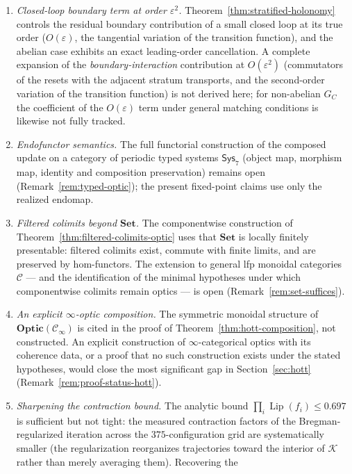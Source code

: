 \documentclass[11pt,a4paper]{article}
\theoremstyle{plain}
\theoremstyle{definition}
\theoremstyle{remark}
\newcommand{\CC}{\mathcal{C}}
\newcommand{\Optic}{\mathbf{Optic}}
\DeclareMathOperator{\Lip}{Lip}
\begin{document}
\begin{enumerate}[leftmargin=*,itemsep=3pt]
\item \emph{Closed-loop boundary term at order $\varepsilon^2$.}
Theorem~\ref{thm:stratified-holonomy} controls the residual boundary
contribution of a small closed loop at its true order
($O(\varepsilon)$, the tangential variation of the transition
function), and the abelian case exhibits an exact leading-order
cancellation. A complete expansion of the
\emph{boundary-interaction} contribution at $O(\varepsilon^2)$
(commutators of the resets with the adjacent stratum transports, and
the second-order variation of the transition function) is not
derived here; for non-abelian $G_C$ the coefficient of the
$O(\varepsilon)$ term under general matching conditions is likewise
not fully tracked.
\item \emph{Endofunctor semantics.} The full functorial construction
of the composed update on a category of periodic typed systems
$\mathsf{Sys}_7$ (object map, morphism map, identity and composition
preservation) remains open
(Remark~\ref{rem:typed-optic}); the present fixed-point claims use
only the realized endomap.
\item \emph{Filtered colimits beyond $\mathbf{Set}$.} The
componentwise construction of
Theorem~\ref{thm:filtered-colimits-optic} uses that $\mathbf{Set}$ is
locally finitely presentable: filtered colimits exist, commute with
finite limits, and are preserved by hom-functors. The extension to
general lfp monoidal categories $\CC$ --- and the identification of
the minimal hypotheses under which componentwise colimits remain
optics --- is open (Remark~\ref{rem:set-suffices}).
\item \emph{An explicit $\infty$-optic composition.} The symmetric
monoidal structure of $\Optic(\mathcal{C}_\infty)$ is cited in the
proof of Theorem~\ref{thm:hott-composition}, not constructed. An
explicit construction of $\infty$-categorical optics with its
coherence data, or a proof that no such construction exists under
the stated hypotheses, would close the most significant gap in
Section~\ref{sec:hott} (Remark~\ref{rem:proof-status-hott}).
\item \emph{Sharpening the contraction bound.} The analytic bound
$\prod_i \Lip(f_i) \leq 0.697$ is sufficient but not tight: the
measured contraction factors of the Bregman-regularized iteration
across the $375$-configuration grid are systematically smaller
(the regularization reorganizes trajectories toward the interior of
$\mathcal K$ rather than merely averaging them). Recovering the

\end{enumerate}
\end{document}
